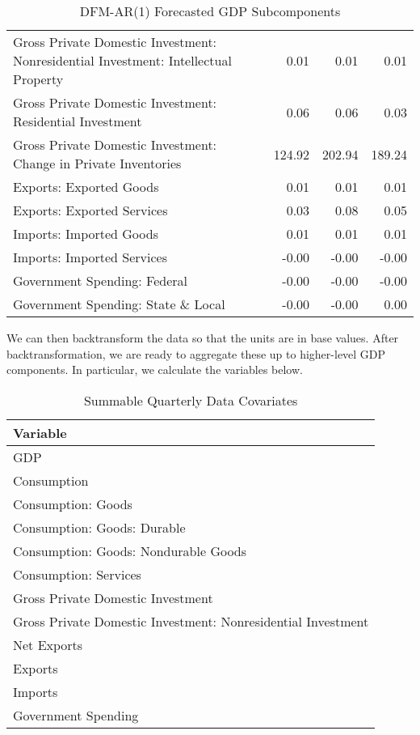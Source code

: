 \documentclass[11pt, letterpaper]{article}\usepackage[]{graphicx}\usepackage[]{color}
\begin{document}
\begin{table}[H]
\begin{tabular}{lrrr}
  Gross Private Domestic Investment: Nonresidential Investment: Intellectual Property & 0.01 & 0.01 & 0.01 \\ 
  Gross Private Domestic Investment: Residential Investment & 0.06 & 0.06 & 0.03 \\ 
  Gross Private Domestic Investment: Change in Private Inventories & 124.92 & 202.94 & 189.24 \\ 
  Exports: Exported Goods & 0.01 & 0.01 & 0.01 \\ 
  Exports: Exported Services & 0.03 & 0.08 & 0.05 \\ 
  Imports: Imported Goods & 0.01 & 0.01 & 0.01 \\ 
  Imports: Imported Services & -0.00 & -0.00 & -0.00 \\ 
  Government Spending: Federal & -0.00 & -0.00 & -0.00 \\ 
  Government Spending: State \& Local & -0.00 & -0.00 & 0.00 \\ 
   \hline
\end{tabular}
\endgroup
\caption{DFM-AR(1) Forecasted GDP Subcomponents} 
\end{table}


We can then backtransform the data so that the units are in base values. After backtransformation, we are ready to aggregate these up to higher-level GDP components. In particular, we calculate the variables below.
\begin{table}[H]
\centering
\begingroup\scriptsize
\begin{tabular}{l}
  \hline
Variable \\ 
  \hline
GDP \\ 
  Consumption \\ 
  Consumption: Goods \\ 
  Consumption: Goods: Durable \\ 
  Consumption: Goods: Nondurable Goods \\ 
  Consumption: Services \\ 
  Gross Private Domestic Investment \\ 
  Gross Private Domestic Investment: Nonresidential Investment \\ 
  Net Exports \\ 
  Exports \\ 
  Imports \\ 
  Government Spending \\ 
   \hline
\end{tabular}
\endgroup
\caption{Summable Quarterly Data Covariates} 
\end{table}
\end{document}

